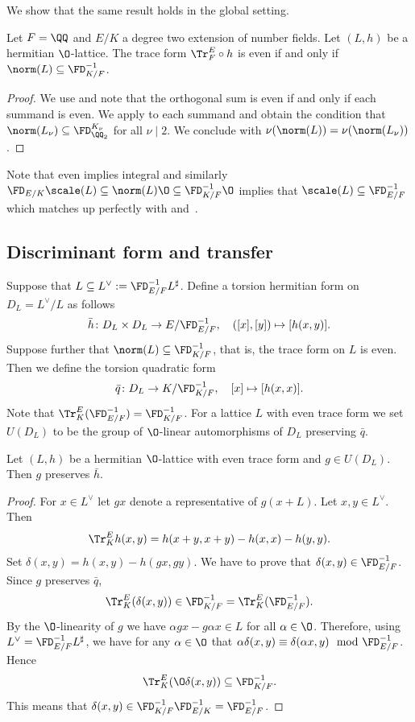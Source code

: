 We show that the same result holds in the global setting.


\begin{corollary}\label{trace}
Let $F=\QQ$ and $E/K$ a degree two extension of number fields. Let $(L,h)$ be a hermitian $\O$-lattice.
The trace form $\Tr^E_F \circ h$ is even if and only if
$\norm(L) \subseteq {\FD_{K/F}^{-1}}$.
\end{corollary}

\begin{proof}
We use  and 
note that the orthogonal sum is even if and only if each summand is even.
We apply  to each summand and obtain the condition that
$\norm(L_\nu) \subseteq \FD^{K_\nu}_{\QQ_2}$ for all $\nu \mid 2$.
We conclude with $\nu(\norm(L)) = \nu(\norm(L_\nu))$.
\end{proof}

Note that even implies integral and similarly ${\FD_{E/K}} \scale(L) \subseteq \norm(L)\O \subseteq {\FD_{K/F}^{-1}}\O$ implies that $\scale(L) \subseteq {\FD_{E/F}^{-1}}$ which matches up perfectly with  and~.

\subsection{Discriminant form and transfer}
Suppose that $L \subseteq L^\vee := {\FD_{E/F}^{-1}} L^\sharp$. Define a torsion hermitian form on $D_L=L^\vee/L$ as follows
\[\bar h\colon D_L \times D_L \to E/{\FD_{E/F}^{-1}}, \quad ([x],[y]) \mapsto [h(x,y)].\]
Suppose further that $\norm(L) \subseteq {\FD_{K/F}^{-1}}$, that is, the trace form on $L$ is even. Then we define the
torsion quadratic form
\[\bar q\colon D_L \to K{/}{\FD_{K/F}^{-1}},\quad [x] \mapsto [h(x,x)].\]
Note that $\Tr^E_K({\FD_{E/F}^{-1}})={\FD_{K/F}^{-1}}$.
For a lattice $L$ with even trace form we set $U(D_L)$ to be the group of $\O$-linear automorphisms of $D_L$ preserving $\bar q$.

\begin{proposition}
Let $(L,h)$ be a hermitian $\O$-lattice with even trace form and
 $g \in U(D_L)$. Then $g$ preserves $\bar h$.
\end{proposition}

\begin{proof}
 For $x \in L^\vee$ let $gx$ denote a representative of $g(x+L)$.
  Let $x,y \in L^\vee$. Then
  \[\Tr^E_K h(x,y) = h(x+y,x+y) - h(x,x) - h(y,y).\]
 Set $\delta(x,y) = h(x,y) - h(gx,gy)$. We have to prove that $\delta(x,y) \in {\FD_{E/F}^{-1}}$.
  Since $g$ preserves $\bar q$,
  \[\Tr^E_K( \delta(x,y)) \in {\FD_{K/F}^{-1}} =\Tr^E_K({\FD_{E/F}^{-1}}). \]
 By the $\O$-linearity of $g$ we have $\alpha gx - g\alpha x \in L$ for all $\alpha \in \O$.
  Therefore, using $L^\vee = {\FD_{E/F}^{-1}}L^\sharp$, we have for any $\alpha \in \O$ that $\alpha \delta(x,y) \equiv \delta(\alpha x,y) \mod {\FD_{E/F}^{-1}}$. Hence
  \[\Tr^E_K(\O \delta(x,y)) \subseteq {\FD_{K/F}^{-1}}.\]
  This means that $\delta(x,y) \in {\FD_{K/F}^{-1}}{\FD_{E/K}^{-1}}={\FD_{E/F}^{-1}}$.
\end{proof}

